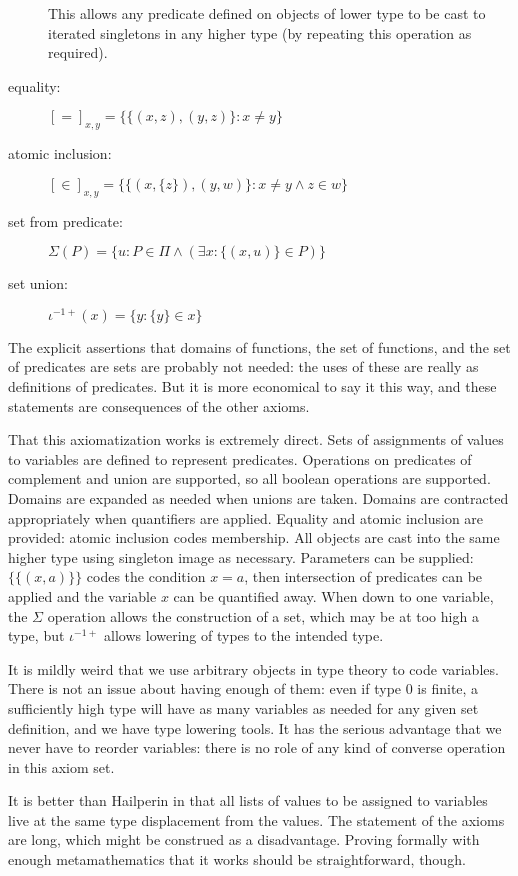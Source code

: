 \documentclass[12pt]{article}
\begin{document}
\begin{description}
This allows any predicate defined on objects of lower type to be cast to iterated singletons in any higher type (by repeating this operation as required).

\item[equality:]  $[=]_{x,y} = \{\{(x,z),(y,z)\}:x\neq y\}$

\item[atomic inclusion:]  $[\in]_{x,y} = \{\{(x,\{z\}),(y,w)\}:x \neq y \wedge z \in w\}$

\item[set from predicate:]  $\Sigma(P) = \{u:P \in \Pi \wedge(\exists x:\{(x,u)\} \in P)\}$

\item[set union:]  $\iota^{-1+}(x) = \{y:\{y\} \in x\}$


\end{description}

The explicit assertions that domains of functions, the set of functions, and the set of predicates are sets are probably not needed:  the uses of these are really as definitions of predicates.  But it is more economical to say it this way, and these statements are consequences of the other axioms.

That this axiomatization works is extremely direct.  Sets of assignments of values to variables are defined to represent predicates.
Operations on predicates of complement and union are supported, so all boolean operations are supported.  Domains are expanded as needed when unions are taken.  Domains are contracted appropriately when quantifiers are applied.   Equality and atomic inclusion are provided:  atomic inclusion codes membership.
All objects are cast into the same higher type using singleton image as necessary.  Parameters can be supplied: $\{\{(x,a)\}\}$ codes the condition $x=a$,
then intersection of predicates can be applied and the variable $x$ can be quantified away.  When down to one variable, the $\Sigma$ operation allows the construction of a set, which may be
at too high a type, but $\iota^{-1+}$ allows lowering of types to the intended type.

It is mildly weird that we use arbitrary objects in type theory to code variables.  There is not an issue about having enough of them:  even if type 0 is finite,
a sufficiently high type will have as many variables as needed for any given set definition, and we have type lowering tools.  It has the serious advantage that we never have to reorder variables:  there is no role of any kind of converse operation in this axiom set.

It is better than Hailperin in that all lists of values to be assigned to variables live at the same type displacement from the values.    The statement of the axioms are long, which might be construed as a disadvantage.  Proving formally with enough metamathematics that it works should be straightforward, though.
\end{document}
